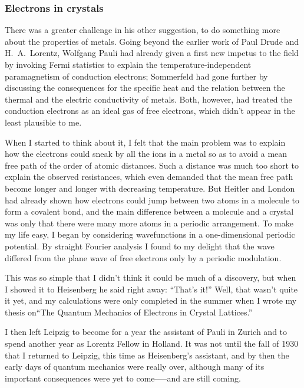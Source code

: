 \documentclass[12pt]{article}
\begin{document}
\subsubsection*{Electrons in crystals}

There was a greater challenge in his other suggestion, to do something more about the properties of metals. Going beyond the earlier work of Paul Drude and H.~A.~Lorentz, Wolfgang Pauli had already given a first new impetus to the field by invoking Fermi statistics to explain the temperature-independent paramagnetism of conduction electrons; Sommerfeld had gone further by discussing the consequences for the specific
heat and the relation between the thermal and the electric conductivity of metals. Both, however, had treated the conduction electrons as an ideal gas of free electrons, which didn't appear in the least plausible to me.

When I started to think about it, I felt that the main problem was to explain how the electrons could sneak by all the ions
in a metal so as to avoid a mean free path of the order of atomic distances. Such a distance was much too short to explain the observed resistances, which even demanded that the mean free path become longer and longer with decreasing temperature. But Heitler and London had already shown how electrons could jump between two atoms in a molecule to form a covalent bond, and the main difference between a molecule and a crystal was only that there were many more atoms in a periodic arrangement. To make my life easy, I began by considering wavefunctions in a one-dimensional periodic potential. By straight Fourier analysis I found to my delight that the wave differed from the plane wave of free electrons only by a periodic modulation.

This was so simple that I didn't think it could be much of a discovery, but when I showed it to Heisenberg he said right away: ``That's it!'' Well, that wasn't quite it yet, and my calculations were only completed in the summer when I wrote my thesis on``The Quantum Mechanics of Electrons in Crystal Lattices.''

I then left Leipzig to become for a year the assistant of Pauli in Zurich and to spend another year as Lorentz Fellow in Holland. It was not until the fall of 1930 that I returned to Leipzig, this time as Heisenberg's assistant, and by then the early days of quantum mechanics were really over, although many of its important consequences were yet to come—--and are still coming.
\end{document}
